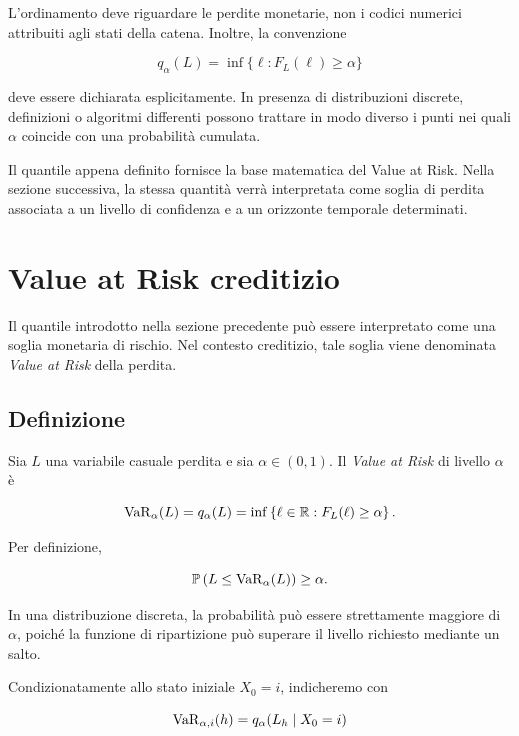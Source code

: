 L'ordinamento deve riguardare le perdite monetarie, non i codici
numerici attribuiti agli stati della catena. Inoltre, la convenzione

\[
q_{\alpha}(L)
=
\inf
\{
\ell:F_L(\ell)\geq\alpha
\}
\]

deve essere dichiarata esplicitamente. In presenza di distribuzioni
discrete, definizioni o algoritmi differenti possono trattare in modo
diverso i punti nei quali $\alpha$ coincide con una probabilit\`{a}
cumulata.

Il quantile appena definito fornisce la base matematica del Value at
Risk. Nella sezione successiva, la stessa quantit\`{a} verr\`{a}
interpretata come soglia di perdita associata a un livello di
confidenza e a un orizzonte temporale determinati.

\section{Value at Risk creditizio}

\label{sec:cap9-var-creditizio}

Il quantile introdotto nella sezione precedente pu\`{o} essere
interpretato come una soglia monetaria di rischio. Nel contesto
creditizio, tale soglia viene denominata \emph{Value at Risk} della
perdita.

\subsection{Definizione}

\label{subsec:cap9-definizione-var}

\begin{definition}
Sia $L$ una variabile casuale perdita e sia $\alpha\in(0,1)$. Il
\emph{Value at Risk} di livello $\alpha$ \`{e}

\[
\operatorname{VaR}_{\alpha}(L)
=
q_{\alpha}(L)
=
\inf
\left\{
\ell\in\mathbb{R}:
F_L(\ell)\geq\alpha
\right\}.
\]
\end{definition}

Per definizione,

\[
\mathbb{P}
\left(
L\leq\operatorname{VaR}_{\alpha}(L)
\right)
\geq
\alpha.
\]

In una distribuzione discreta, la probabilit\`{a} pu\`{o} essere
strettamente maggiore di $\alpha$, poich\'{e} la funzione di
ripartizione pu\`{o} superare il livello richiesto mediante un salto.

Condizionatamente allo stato iniziale $X_0=i$, indicheremo con

\[
\operatorname{VaR}_{\alpha,i}(h)
=
q_{\alpha}(L_h\mid X_0=i)
\]

